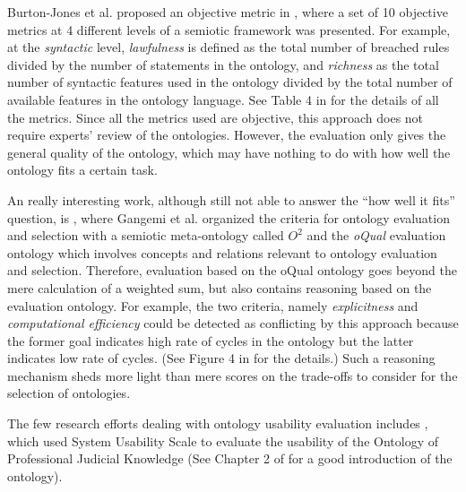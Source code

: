 Burton-Jones et al. proposed an objective metric in \cite{burton2005semiotic}, where a set of 10 objective metrics at 4 different levels of a semiotic framework was presented. For example, at the \emph{syntactic} level, \emph{lawfulness} is defined as the total number of breached rules divided by the number of statements in the ontology, and \emph{richness} as the total number of syntactic features used in the ontology divided by the total number of available features in the ontology language. See Table 4 in \cite{burton2005semiotic} for the details of all the metrics. Since all the metrics used are objective, this approach does not require experts' review of the ontologies. However, the evaluation only gives the general quality of the ontology, which may have nothing to do with how well the ontology fits a certain task.

An really interesting work, although still not able to answer the ``how well it fits'' question, is \cite{gangemi2006qood}, where Gangemi et al. organized the criteria for ontology evaluation and selection with a semiotic meta-ontology called $O^2$ and the \emph{oQual} evaluation ontology which involves concepts and relations relevant to ontology evaluation and selection. Therefore, evaluation based on the oQual ontology goes beyond the mere calculation of a weighted sum, but also contains reasoning based on the evaluation ontology. For example, the two criteria, namely \emph{explicitness} and \emph{computational efficiency} could be detected as conflicting by this approach because the former goal indicates high rate of cycles in the ontology but the latter indicates low rate of cycles. (See Figure 4 in \cite{gangemi2006qood} for the details.) Such a reasoning mechanism sheds more light than mere scores on the trade-offs to consider for the selection of ontologies.

The few research efforts dealing with ontology usability evaluation includes \cite{casellas2009ontology}, which used System Usability Scale \cite{brooke1996sus} to evaluate the usability of the Ontology of Professional Judicial Knowledge (See Chapter 2 of \cite{casellas2009ontology} for a good introduction of the ontology).

